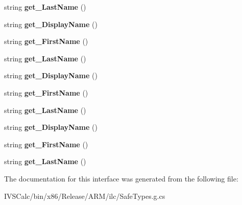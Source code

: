 \begin{DoxyCompactItemize}
string {\bfseries get\+\_\+\+Last\+Name} ()
\item 
\mbox{\label{interface_windows_1_1_system_1_1_i_known_user_properties_statics_ac8b9cfb2d103bf28e697bd08221113d0}} 
string {\bfseries get\+\_\+\+Display\+Name} ()
\item 
\mbox{\label{interface_windows_1_1_system_1_1_i_known_user_properties_statics_a81b595e47eead1dec9be6ca5de7ff125}} 
string {\bfseries get\+\_\+\+First\+Name} ()
\item 
\mbox{\label{interface_windows_1_1_system_1_1_i_known_user_properties_statics_ac8b7ba9047a6a5661a366c2bd1127682}} 
string {\bfseries get\+\_\+\+Last\+Name} ()
\item 
\mbox{\label{interface_windows_1_1_system_1_1_i_known_user_properties_statics_ac8b9cfb2d103bf28e697bd08221113d0}} 
string {\bfseries get\+\_\+\+Display\+Name} ()
\item 
\mbox{\label{interface_windows_1_1_system_1_1_i_known_user_properties_statics_a81b595e47eead1dec9be6ca5de7ff125}} 
string {\bfseries get\+\_\+\+First\+Name} ()
\item 
\mbox{\label{interface_windows_1_1_system_1_1_i_known_user_properties_statics_ac8b7ba9047a6a5661a366c2bd1127682}} 
string {\bfseries get\+\_\+\+Last\+Name} ()
\item 
\mbox{\label{interface_windows_1_1_system_1_1_i_known_user_properties_statics_ac8b9cfb2d103bf28e697bd08221113d0}} 
string {\bfseries get\+\_\+\+Display\+Name} ()
\item 
\mbox{\label{interface_windows_1_1_system_1_1_i_known_user_properties_statics_a81b595e47eead1dec9be6ca5de7ff125}} 
string {\bfseries get\+\_\+\+First\+Name} ()
\item 
\mbox{\label{interface_windows_1_1_system_1_1_i_known_user_properties_statics_ac8b7ba9047a6a5661a366c2bd1127682}} 
string {\bfseries get\+\_\+\+Last\+Name} ()
\end{DoxyCompactItemize}


The documentation for this interface was generated from the following file\+:\begin{DoxyCompactItemize}
\item 
I\+V\+S\+Calc/bin/x86/\+Release/\+A\+R\+M/ilc/Safe\+Types.\+g.\+cs\end{DoxyCompactItemize}
